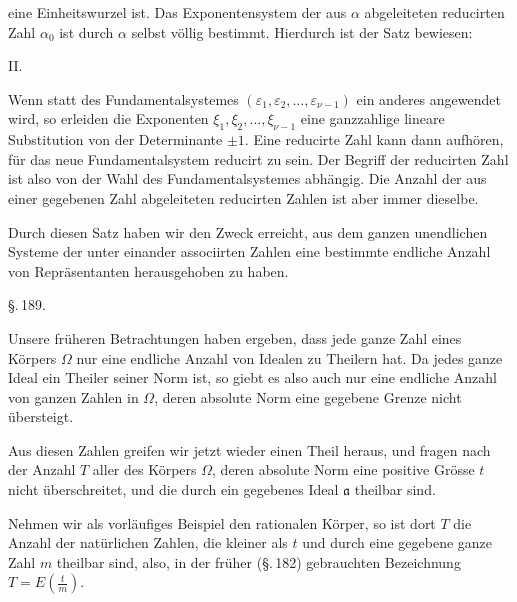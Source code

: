eine Einheitswurzel ist. Das Exponentensystem der aus $\alpha$ abgeleiteten
 reducirten Zahl $\alpha_0$ ist durch $\alpha$ selbst völlig bestimmt.
Hierdurch ist der Satz bewiesen:

II. 

Wenn statt des Fundamentalsystemes $(\varepsilon_1, \varepsilon_2, \ldots, \varepsilon_{\nu-1})$ ein
anderes angewendet wird, so erleiden die Exponenten $\xi_1, \xi_2, \ldots, \xi_{\nu-1}$
eine ganzzahlige lineare Substitution von der Determinante $\pm 1$.
Eine reducirte Zahl kann dann aufhören, für das neue Fundamentalsystem
 reducirt zu sein. Der Begriff der reducirten Zahl
ist also von der Wahl des Fundamentalsystemes abhängig. Die
Anzahl der aus einer gegebenen Zahl abgeleiteten reducirten
Zahlen ist aber immer dieselbe.

Durch diesen Satz haben wir den Zweck erreicht, aus
dem ganzen unendlichen Systeme der unter einander associirten
Zahlen eine bestimmte endliche Anzahl von Repräsentanten
herausgehoben zu haben.

\begin{center}
\S.\,189.\\[4pt]
\end{center}

Unsere früheren Betrachtungen haben ergeben, dass jede
ganze Zahl eines Körpers $\Omega$ nur eine endliche Anzahl von Idealen
zu Theilern hat. Da jedes ganze Ideal ein Theiler seiner Norm
ist, so giebt es also auch nur eine endliche Anzahl von ganzen
Zahlen in $\Omega$, deren absolute Norm eine gegebene Grenze nicht
übersteigt.

Aus diesen Zahlen greifen wir jetzt wieder einen Theil
heraus, und fragen nach der Anzahl $T$ aller 
des Körpers $\Omega$, deren absolute Norm eine positive Grösse $t$
nicht überschreitet, und die durch ein gegebenes Ideal $\mathfrak{a}$ theilbar
 sind.

Nehmen wir als vorläufiges Beispiel den rationalen Körper,
so ist dort $T$ die Anzahl der natürlichen Zahlen, die kleiner als
$t$ und durch eine gegebene ganze Zahl $m$ theilbar sind, also, in
der früher (\S.\,182) gebrauchten Bezeichnung $T = E\left(\frac{t}{m}\right)$.
